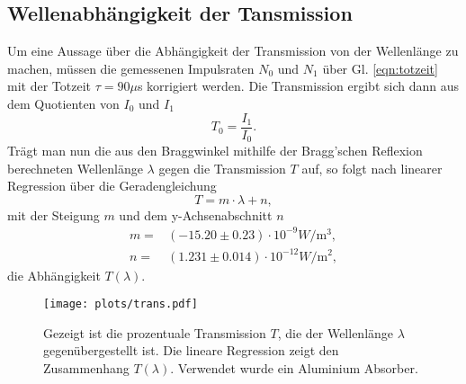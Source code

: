 \subsection{Wellenabhängigkeit der Tansmission}
Um eine Aussage über die Abhängigkeit der Transmission von der Wellenlänge
zu machen, müssen die gemessenen Impulsraten $N_0$ und $N_1$ über Gl. \ref{eqn:totzeit}
mit der Totzeit $\tau=90\mu$s korrigiert werden. Die Transmission ergibt sich dann aus dem Quotienten
von $I_0$ und $I_1$
\begin{equation}
    T_0=\frac{I_1}{I_0}.
    \label{eqn:trans}
\end{equation}
Trägt man nun die aus den Braggwinkel mithilfe der Bragg'schen Reflexion
berechneten Wellenlänge $\lambda$ gegen die Transmission $T$ auf, so folgt
nach linearer Regression über die Geradengleichung
\begin{equation*}
    T=m\cdot \lambda + n,
\end{equation*}
mit der Steigung $m$ und dem y-Achsenabschnitt $n$
\begin{align*}
    m=&(-15.20\pm0.23)\cdot 10^{-9}\si{W\per\m^3},\\ 
    n=&(1.231\pm0.014)\cdot 10^{-12}\si{W\per\m^2},
\end{align*}
die Abhängigkeit $T(\lambda).$
\begin{figure}[H]
    \centering
    \texttt{[image: plots/trans.pdf]}
    \caption{Gezeigt ist die prozentuale Transmission $T$, die der Wellenlänge $\lambda$
    gegenübergestellt ist. Die lineare Regression zeigt den Zusammenhang $T(\lambda)$.
    Verwendet wurde ein Aluminium Absorber.}
\end{figure}
\label{sub:trans}


